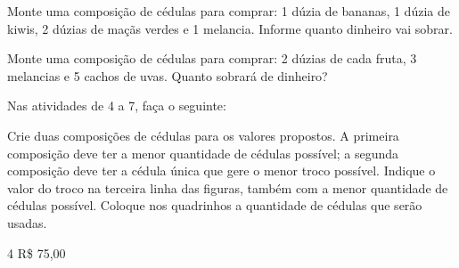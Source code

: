 \begin{escolha}[itemsep=-5pt]
\item Monte uma composição de cédulas para comprar: 1 dúzia de bananas, 1 dúzia de kiwis, 2 dúzias de maçãs verdes e 1 melancia. Informe quanto dinheiro vai sobrar.
\hfill
\reduline{\mbox{}\hfill}

\reduline{\mbox{}\hfill}

\reduline{\mbox{}\hfill}

\item Monte uma composição de cédulas para comprar: 2 dúzias de cada fruta, 3 melancias e 5 cachos de uvas. Quanto sobrará de dinheiro?
\hfill
\reduline{\mbox{}\hfill}

\reduline{\mbox{}\hfill}

\reduline{\mbox{}\hfill}
\end{escolha}

\pagebreak
Nas atividades de 4 a 7, faça o seguinte:

Crie duas composições de cédulas para os valores propostos. A primeira composição deve ter a menor quantidade de cédulas possível; a segunda composição deve ter a cédula única que gere o menor troco possível. Indique o valor do troco na terceira linha das figuras, também com a menor quantidade de cédulas possível. Coloque nos quadrinhos a quantidade de cédulas que serão usadas.



\num{4} R\$ 75,00

